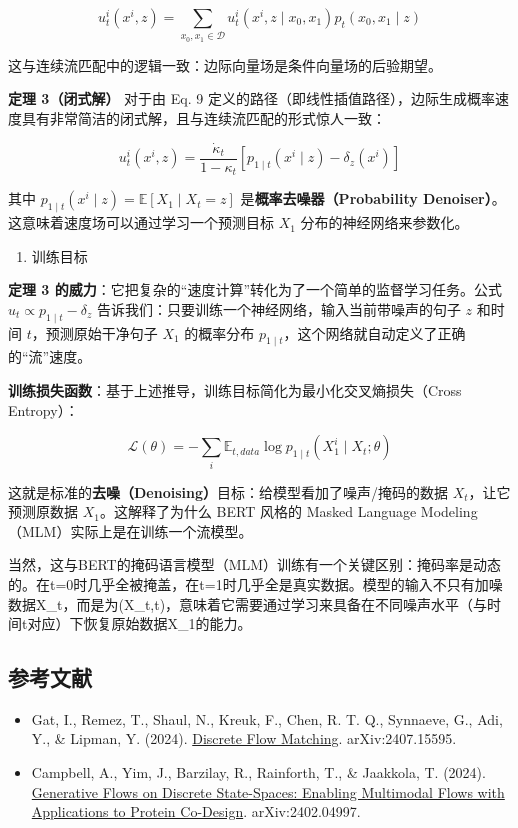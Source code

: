 \[
u_t^i(x^i,z)=\sum_{x_0,x_1\in\mathcal{D}}u_t^i(x^i,z\mid x_0,x_1)p_t(x_0,x_1\mid z)
\]

这与连续流匹配中的逻辑一致：边际向量场是条件向量场的后验期望。

\textbf{定理 3（闭式解）} 对于由 Eq. 9 定义的路径（即线性插值路径），边际生成概率速度具有非常简洁的闭式解，且与连续流匹配的形式惊人一致：

\[
u_t^i(x^i,z)=\frac{\dot{\kappa}_t}{1-\kappa_t}[p_{1\mid t}(x^i\mid z)-\delta_z(x^i)]
\]

其中 \(p_{1\mid t}(x^i\mid z)=\mathbb{E}[X_1\mid X_t=z]\) 是\textbf{概率去噪器（Probability Denoiser）}。这意味着速度场可以通过学习一个预测目标 \(X_1\) 分布的神经网络来参数化。

\begin{enumerate}
\def\labelenumi{\arabic{enumi}.}
\setcounter{enumi}{2}
\tightlist
\item
  训练目标
\end{enumerate}

\textbf{定理 3 的威力}：它把复杂的``速度计算''转化为了一个简单的监督学习任务。公式 \(u_t\propto p_{1\mid t}-\delta_z\) 告诉我们：只要训练一个神经网络，输入当前带噪声的句子 \(z\) 和时间 \(t\)，预测原始干净句子 \(X_1\) 的概率分布 \(p_{1\mid t}\)，这个网络就自动定义了正确的``流''速度。

\textbf{训练损失函数}：基于上述推导，训练目标简化为最小化交叉熵损失（Cross Entropy）：

\[
\mathcal{L}(\theta)=-\sum_i\mathbb{E}_{t,data}\log p_{1\mid t}(X_1^i\mid X_t;\theta)
\]

这就是标准的\textbf{去噪（Denoising）}目标：给模型看加了噪声/掩码的数据 \(X_t\)，让它预测原数据 \(X_1\)。这解释了为什么 BERT 风格的 Masked Language Modeling（MLM）实际上是在训练一个流模型。

当然，这与BERT的掩码语言模型（MLM）训练有一个关键区别：掩码率是动态的。在t=0时几乎全被掩盖，在t=1时几乎全是真实数据。模型的输入不只有加噪数据X\_t，而是为(X\_t,t)，意味着它需要通过学习来具备在不同噪声水平（与时间t对应）下恢复原始数据X\_1的能力。

\FloatBarrier
{}
\hypertarget{ux53c2ux8003ux6587ux732e-136}{%
\subsection{参考文献}\label{ux53c2ux8003ux6587ux732e-136}}

\vspace{0.25em}
\begin{itemize}
\tightlist
\item
  Gat, I., Remez, T., Shaul, N., Kreuk, F., Chen, R. T. Q., Synnaeve, G., Adi, Y., \& Lipman, Y. (2024). \href{https://arxiv.org/abs/2407.15595}{Discrete Flow Matching}. arXiv:2407.15595.
\item
  Campbell, A., Yim, J., Barzilay, R., Rainforth, T., \& Jaakkola, T. (2024). \href{https://arxiv.org/abs/2402.04997}{Generative Flows on Discrete State-Spaces: Enabling Multimodal Flows with Applications to Protein Co-Design}. arXiv:2402.04997.
\end{itemize}

\clearpage
